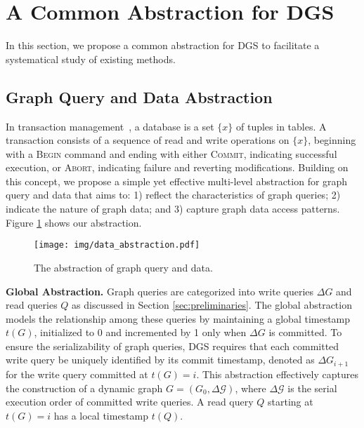 \section{A Common Abstraction for DGS}\label{sec:framework}

In this section, we propose a common abstraction for DGS to facilitate a systematical study of existing methods.

\subsection{Graph Query and Data Abstraction}\label{sec:data_abstraction}

In transaction management~\cite{ramakrishnan2002database}, a database is a set $\{x\}$ of tuples in tables. A transaction consists of a sequence of read and write operations on $\{x\}$, beginning with a \textsc{Begin} command and ending with either \textsc{Commit}, indicating successful execution, or \textsc{Abort}, indicating failure and reverting modifications. Building on this concept, we propose a simple yet effective multi-level abstraction for graph query and data that aims to: 1) reflect the characteristics of graph queries; 2) indicate the nature of graph data; and 3) capture graph data access patterns. Figure \ref{fig:data_abstraction} shows our abstraction.

\begin{figure}[h]\small
    \setlength{\abovecaptionskip}{3pt}
    \setlength{\belowcaptionskip}{0pt}
    \texttt{[image: img/data\_abstraction.pdf]}
    \centering
    \caption{The abstraction of graph query and data.}
    \label{fig:data_abstraction}
\end{figure}

\noindent\textbf{Global Abstraction.} Graph queries are categorized into write queries $\Delta G$ and read queries $Q$ as discussed in Section \ref{sec:preliminaries}. The global abstraction models the relationship among these queries by maintaining a global timestamp $t(G)$, initialized to 0 and incremented by 1 only when $\Delta G$ is committed. To ensure the serializability of graph queries, DGS requires that each committed write query be uniquely identified by its commit timestamp, denoted as $\Delta G_{i + 1}$ for the write query committed at $t(G) = i$. This abstraction effectively captures the construction of a dynamic graph $G = (G_0, \Delta \mathcal{G})$, where $\Delta \mathcal{G}$ is the serial execution order of committed write queries. A read query $Q$ starting at $t(G) = i$ has a local timestamp $t(Q)$.

